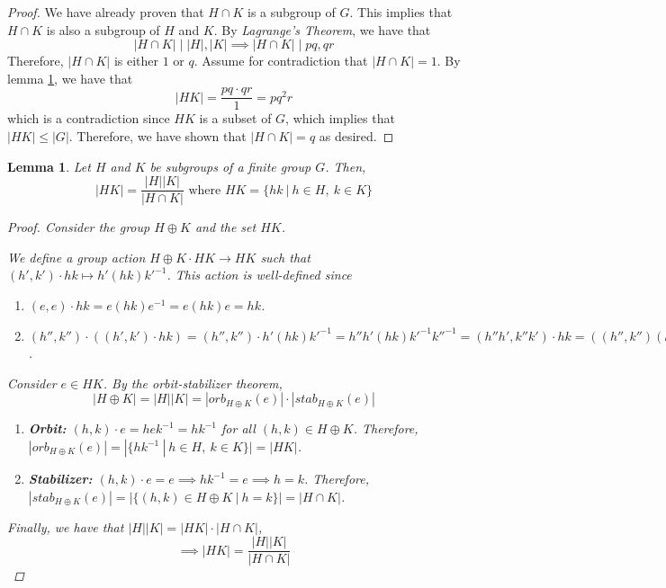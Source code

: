 \documentclass[12pt,reqno]{article}
\theoremstyle{plain}
\newtheorem{lemma}{Lemma}
\theoremstyle{definition}
\begin{document}
\begin{proof}
    We have already proven that \(H\cap K\) is a subgroup of \(G\). This implies that \(H\cap K\) is also a
    subgroup of \(H\) and \(K\). By \emph{Lagrange's Theorem}, we have that 
    \[|H\cap K|\mid |H|,|K|\implies |H\cap K|\mid pq,qr\]
    Therefore, \(|H\cap K|\) is either \(1\) or \(q\). Assume for contradiction that
    \(|H\cap K|=1\). By lemma \ref{lem:HK}, we have that
    \[|HK|=\frac{pq\cdot qr}{1}=pq^2r\]
    which is a contradiction since \(HK\) is a subset of \(G\), which implies that
    \(|HK|\leq|G|\). Therefore, we have shown that \(|H\cap K|=q\) as desired.
\end{proof}
\bigskip
\begin{lemma}
    \label{lem:HK}
    Let \(H\) and \(K\) be subgroups of a finite group \(G\). Then,
    \[|HK|=\frac{|H||K|}{|H\cap K|} \text{ where } HK=\{hk\ |\ h\in H,\ k\in K\}\]
    
    \begin{proof}
        Consider the group \(H\oplus K\) and the set \(HK\).
        
        We define a group action \(H\oplus K\cdot HK\to HK\) such that \((h',k')\cdot hk\mapsto h'(hk)k'^{-1}\).
        This action is well-defined since
        \begin{enumerate}
            \item \((e,e)\cdot hk=e(hk)e^{-1}=e(hk)e=hk\).
            \item \((h'',k'')\cdot ((h',k')\cdot hk)=(h'',k'')\cdot h'(hk)k'^{-1}= h''h'(hk)k'^{-1}k''^{-1}=(h''h',k''k')\cdot hk=((h'',k'')(h',k'))\cdot hk\).
        \end{enumerate}
        Consider \(e\in HK\). By the \emph{orbit-stabilizer theorem},
        \[|H\oplus K|=|H||K|=|orb_{H\oplus K}(e)|\cdot |stab_{H\oplus K}(e)|\]
        \begin{enumerate}
            \item \textbf{Orbit:} \((h,k)\cdot e=hek^{-1}=hk^{-1}\) for all \((h,k)\in H\oplus K\).
            Therefore, \(|orb_{H\oplus K}(e)|=|\{hk^{-1}\ |\ h\in H,\ k\in K\}|=|HK|\).
            \item \textbf{Stabilizer:} \((h,k)\cdot e=e\implies hk^{-1}=e\implies h=k\). Therefore,
            \(|stab_{H\oplus K}(e)|=|\{(h,k)\in H\oplus K\ |\ h=k\}|=|H\cap K|\).
        \end{enumerate}
        Finally, we have that \(|H||K|=|HK|\cdot|H\cap K|\),
        \[\implies|HK|=\frac{|H||K|}{|H\cap K|}\]
    \end{proof}
\end{lemma}
\end{document}
